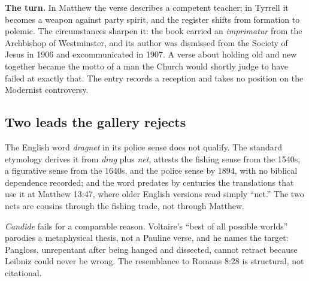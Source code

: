 \textbf{The turn.} In Matthew the verse describes a competent teacher; in Tyrrell it becomes a weapon against party spirit, and the register shifts from formation to polemic. The circumstances sharpen it: the book carried an \emph{imprimatur} from the Archbishop of Westminster, and its author was dismissed from the Society of Jesus in 1906 and excommunicated in 1907. A verse about holding old and new together became the motto of a man the Church would shortly judge to have failed at exactly that. The entry records a reception and takes no position on the Modernist controversy.

\subsection*{Two leads the gallery rejects}

The English word \emph{dragnet} in its police sense does not qualify. The standard etymology derives it from \emph{drag} plus \emph{net}, attests the fishing sense from the 1540s, a figurative sense from the 1640s, and the police sense by 1894, with no biblical dependence recorded; and the word predates by centuries the translations that use it at Matthew 13:47, where older English versions read simply ``net.'' The two nets are cousins through the fishing trade, not through Matthew.

\emph{Candide} fails for a comparable reason. Voltaire's ``best of all possible worlds'' parodies a metaphysical thesis, not a Pauline verse, and he names the target: Pangloss, unrepentant after being hanged and dissected, cannot retract because Leibniz could never be wrong. The resemblance to Romans 8:28 is structural, not citational.
